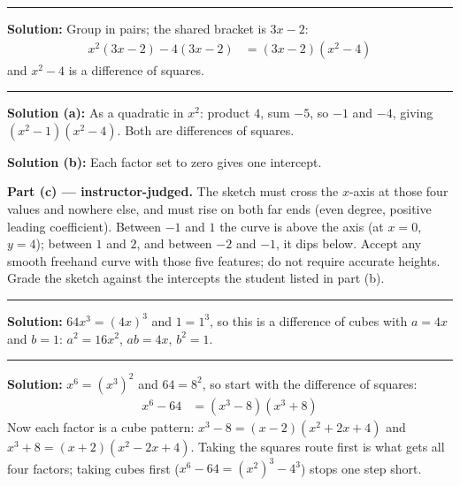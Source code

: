 \documentclass[12pt]{article}
\begin{document}
\vspace{0.15cm}
\noindent\rule{\linewidth}{0.2pt}


\textbf{Solution:} Group in pairs; the shared bracket is $3x - 2$:
\begin{align*}
  x^{2}(3x - 2) - 4(3x - 2) &= (3x - 2)(x^{2} - 4)
\end{align*}
and $x^{2} - 4$ is a difference of squares. 

\vspace{0.15cm}
\noindent\rule{\linewidth}{0.2pt}


\textbf{Solution (a):} As a quadratic in $x^{2}$: product $4$, sum $-5$, so
$-1$ and $-4$, giving $(x^{2} - 1)(x^{2} - 4)$. Both are differences of
squares. 

\textbf{Solution (b):} Each factor set to zero gives one intercept. 

\textbf{Part (c) --- instructor-judged.} The sketch must cross the $x$-axis at
those four values and nowhere else, and must rise on both far ends (even degree,
positive leading coefficient). Between $-1$ and $1$ the curve is above the axis
(at $x = 0$, $y = 4$); between $1$ and $2$, and between $-2$ and $-1$, it dips
below. Accept any smooth freehand curve with those five features; do not require
accurate heights. Grade the sketch against the intercepts the student listed in
part (b).

\vspace{0.15cm}
\noindent\rule{\linewidth}{0.2pt}


\textbf{Solution:} $64x^{3} = (4x)^{3}$ and $1 = 1^{3}$, so this is a difference
of cubes with $a = 4x$ and $b = 1$: $a^{2} = 16x^{2}$, $ab = 4x$, $b^{2} = 1$.

\vspace{0.15cm}
\noindent\rule{\linewidth}{0.2pt}


\textbf{Solution:} $x^{6} = (x^{3})^{2}$ and $64 = 8^{2}$, so start with the
difference of squares:
\begin{align*}
  x^{6} - 64 &= (x^{3} - 8)(x^{3} + 8)
\end{align*}
Now each factor is a cube pattern: $x^{3} - 8 = (x - 2)(x^{2} + 2x + 4)$ and
$x^{3} + 8 = (x + 2)(x^{2} - 2x + 4)$. Taking the squares route first is what
gets all four factors; taking cubes first
($x^{6} - 64 = (x^{2})^{3} - 4^{3}$) stops one step short.
\end{document}
